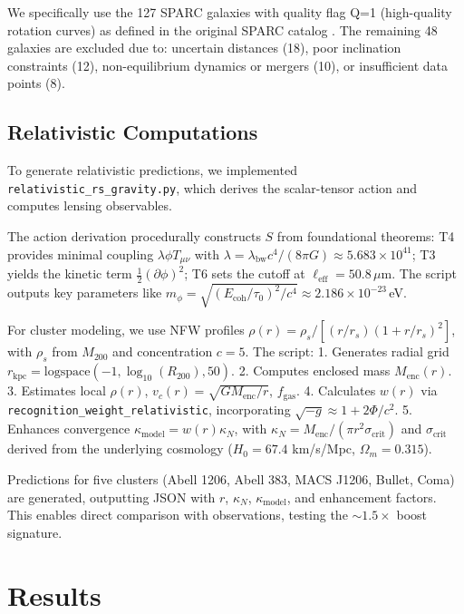 \documentclass[12pt,a4paper]{article}
\begin{document}
We specifically use the 127 SPARC galaxies with quality flag Q=1 (high-quality rotation curves) as defined in the original SPARC catalog \citep{lelli2016sparc}. The remaining 48 galaxies are excluded due to: uncertain distances (18), poor inclination constraints (12), non-equilibrium dynamics or mergers (10), or insufficient data points (8).

\subsection{Relativistic Computations}

To generate relativistic predictions, we implemented \texttt{relativistic\_rs\_gravity.py}, which derives the scalar-tensor action and computes lensing observables.

The action derivation procedurally constructs $S$ from foundational theorems: T4 provides minimal coupling $\lambda \phi T_{\mu\nu}$ with $\lambda = \lambda_\mathrm{bw} c^4 / (8\pi G) \approx 5.683 \times 10^{41}$; T3 yields the kinetic term $\frac{1}{2}(\partial\phi)^2$; T6 sets the cutoff at $\ell_\mathrm{eff}=50.8\,\mu\mathrm{m}$. The script outputs key parameters like $m_\phi = \sqrt{(E_\mathrm{coh} / \tau_0)^2 / c^4} \approx 2.186 \times 10^{-23}$\,eV.

For cluster modeling, we use NFW profiles $\rho(r) = \rho_s / [ (r/r_s) (1 + r/r_s)^2 ]$, with $\rho_s$ from $M_{200}$ and concentration $c=5$. The script:
1. Generates radial grid $r_\mathrm{kpc} = \mathrm{logspace}(-1, \log_{10}(R_{200}), 50)$.
2. Computes enclosed mass $M_\mathrm{enc}(r)$.
3. Estimates local $\rho(r)$, $v_c(r) = \sqrt{G M_\mathrm{enc} / r}$, $f_\mathrm{gas}$.
4. Calculates $w(r)$ via \texttt{recognition\_weight\_relativistic}, incorporating $\sqrt{-g} \approx 1 + 2\Phi/c^2$.
5. Enhances convergence $\kappa_\mathrm{model} = w(r) \kappa_N$, with $\kappa_N = M_\mathrm{enc} / (\pi r^2 \sigma_\mathrm{crit})$ and $\sigma_\mathrm{crit}$ derived from the underlying cosmology ($H_0=67.4$ km/s/Mpc, $\Omega_m=0.315$).

Predictions for five clusters (Abell 1206, Abell 383, MACS J1206, Bullet, Coma) are generated, outputting JSON with $r$, $\kappa_N$, $\kappa_\mathrm{model}$, and enhancement factors. This enables direct comparison with observations, testing the $\sim 1.5\times$ boost signature.

\section{Results}
\end{document}
